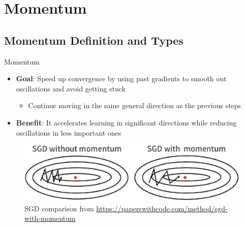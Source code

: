 \documentclass[serif, aspectratio=169]{beamer}
\begin{document}
\section{Momentum}
\subsection{Momentum Definition and Types}
\begin{frame}{Momentum}
    \begin{minipage}{0.5\textwidth}
        \begin{itemize}
            \item \textbf{Goal}: Speed up convergence by using past gradients to smooth out oscillations and avoid getting stuck
            \begin{itemize}
                \item Continue moving in the same general direction as the previous steps
            \end{itemize}
            \item \textbf{Benefit}: It accelerates learning in significant directions while reducing oscillations in less important ones
        \end{itemize}
    \end{minipage}%
    \begin{minipage}{0.5\linewidth}
    \begin{figure}[h]
        \centering
        \includegraphics[height=.25\textheight]{pic/momentum_paperswithcode.jpg}
        \caption{\footnotesize SGD comparison from \url{https://paperswithcode.com/method/sgd-with-momentum}}
    \end{figure}
    \end{minipage}
\end{frame}
\end{document}
